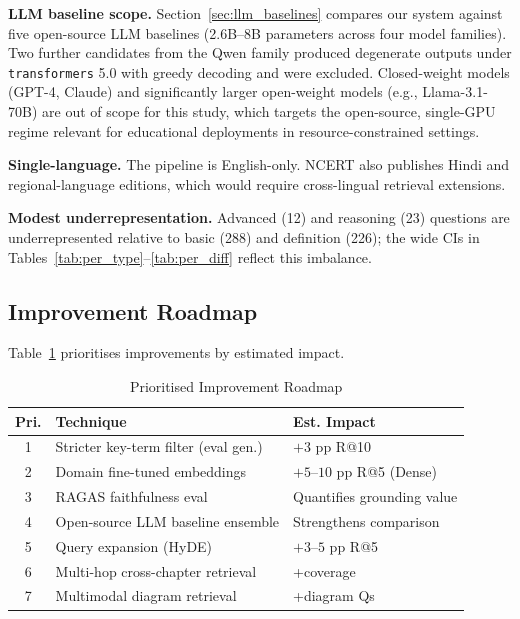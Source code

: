 \documentclass[conference]{IEEEtran}
\begin{document}
\textbf{LLM baseline scope.} Section~\ref{sec:llm_baselines} compares our system against five open-source LLM baselines (2.6B--8B parameters across four model families). Two further candidates from the Qwen family produced degenerate outputs under \texttt{transformers} 5.0 with greedy decoding and were excluded. Closed-weight models (GPT-4, Claude) and significantly larger open-weight models (e.g., Llama-3.1-70B) are out of scope for this study, which targets the open-source, single-GPU regime relevant for educational deployments in resource-constrained settings.

\textbf{Single-language.} The pipeline is English-only. NCERT also publishes Hindi and regional-language editions, which would require cross-lingual retrieval extensions.

\textbf{Modest underrepresentation.} Advanced (12) and reasoning (23) questions are underrepresented relative to basic (288) and definition (226); the wide CIs in Tables~\ref{tab:per_type}--\ref{tab:per_diff} reflect this imbalance.

\subsection{Improvement Roadmap}
Table~\ref{tab:roadmap} prioritises improvements by estimated impact.

\begin{table}[!t]
\caption{Prioritised Improvement Roadmap}
\label{tab:roadmap}
\centering\scriptsize
\setlength{\tabcolsep}{3pt}
\begin{tabular}{@{}c p{} p{}@{}}
\toprule
\textbf{Pri.} & \textbf{Technique} & \textbf{Est. Impact} \\
\midrule
1 & Stricter key-term filter (eval gen.)        & $+3$ pp R@10 \\
2 & Domain fine-tuned embeddings                & $+5$--$10$ pp R@5 (Dense) \\
3 & RAGAS faithfulness eval                     & Quantifies grounding value \\
4 & Open-source LLM baseline ensemble           & Strengthens comparison \\
5 & Query expansion (HyDE)~\cite{gao2023hyde}   & $+3$--$5$ pp R@5 \\
6 & Multi-hop cross-chapter retrieval           & +coverage \\
7 & Multimodal diagram retrieval                & +diagram Qs \\
\bottomrule
\end{tabular}
\end{table}
\end{document}
